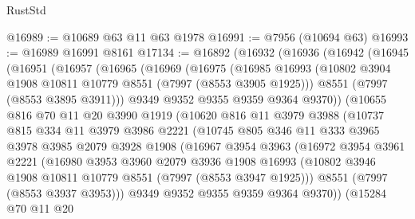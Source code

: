 \begin{lexlean}{RustStd}
\begin{coremodule}
@16989 := @10689 @63 @11 @63 @1978
@16991 := @7956 (@10694 @63)
@16993 := @16989 @16991 @8161
@17134 := @16892
    (@16932
      (@16936
        (@16942
          (@16945
            (@16951
              (@16957
                (@16965
                  (@16969
                    (@16975
                      (@16985
                        @16993
                        (@10802 @3904 @1908 @10811 @10779 @8551 (@7997 (@8553 @3905 @1925)))
                        @8551
                        (@7997 (@8553 @3895 @3911)))
                      @9349
                      @9352
                      @9355
                      @9359
                      @9364
                      @9370))
                  (@10655
                    @816
                    @70
                    @11
                    @20
                    @3990
                    @1919
                    (@10620
                      @816
                      @11
                      @3979
                      @3988
                      (@10737
                        @815
                        @334
                        @11
                        @3979
                        @3986
                        @2221
                        (@10745
                          @805
                          @346
                          @11
                          @333
                          @3965
                          @3978
                          @3985
                          @2079
                          @3928
                          @1908
                          (@16967
                            @3954
                            @3963
                            (@16972
                              @3954
                              @3961
                              @2221
                              (@16980
                                @3953
                                @3960
                                @2079
                                @3936
                                @1908
                                @16993
                                (@10802 @3946 @1908 @10811 @10779 @8551 (@7997 (@8553 @3947 @1925)))
                                @8551
                                (@7997 (@8553 @3937 @3953)))
                              @9349
                              @9352
                              @9355
                              @9359
                              @9364
                              @9370))
                          (@15284
                            @70
                            @11
                            @20

\end{coremodule}
\end{lexlean}
